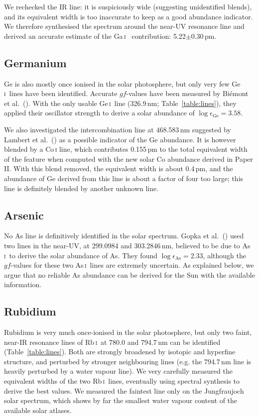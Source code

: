 \documentclass[traditabstract]{aa}
\newcommand{\altgai}{Ga\,\textsc{i}}
\newcommand{\altgei}{Ge\,\textsc{i}}
\newcommand{\altasi}{As\,\textsc{i}}
\newcommand{\altrbi}{Rb\,\textsc{i}}
\newcommand{\gai}{\altgai\ }
\newcommand{\gei}{\altgei\ }
\newcommand{\asi}{\altasi\ }
\newcommand{\rbi}{\altrbi\ }
\begin{document}
We rechecked the IR line: it is suspiciously wide (suggesting unidentified blends), and its equivalent width
is too inaccurate to keep as a good abundance indicator. We therefore synthesised the spectrum around
the near-UV resonance line and derived an accurate estimate of the \gai
contribution: 5.22$\pm$0.30\,pm.

\subsection{Germanium}
Ge is also mostly once ionised in the solar photosphere, but only very few \gei lines have been identified. Accurate $gf$-values have been measured by Bi\'emont et al.\ (\cite{biem2}).  With the only usable \gei line (326.9\,nm; Table~\ref{table:lines}), they applied their oscillator strength to derive a solar abundance of $\log\epsilon_{\mathrm{Ge}}=3.58$.

We also investigated the intercombination line at 468.583\,nm suggested by Lambert et al.\ (\cite{lamb}) as a possible indicator of the Ge abundance. It is however blended by a Co\,\textsc{i} line, which contributes 0.155\,pm to the total equivalent width of the feature when computed with the new solar Co abundance derived in Paper II.  With this blend removed, the equivalent width is about 0.4\,pm, and the abundance of Ge derived from this line is about a factor of four too large; this line is definitely blended by another unknown line.

\subsection{Arsenic}
No As line is definitively identified in the solar spectrum. Gopka et al.\ (\cite{gopka}) used two lines in the near-UV, at 299.0984 and 303.2846\,nm, believed to be due to \asi to derive the solar abundance of As.  They found $\log \epsilon_{\mathrm{As}}=2.33$, although the $gf$-values for these two \asi lines are extremely uncertain. As explained below, we argue that no reliable As abundance can be derived for the Sun with the available information. 

\subsection{Rubidium}
Rubidium is very much once-ionised in the solar photosphere, but only two faint, near-IR resonance lines  of \rbi at 780.0 and 794.7\,nm can be identified (Table~\ref{table:lines}).  Both are strongly broadened by isotopic and hyperfine structure, and perturbed by stronger neighbouring lines (e.g. the 794.7\,nm line is heavily
perturbed by a water vapour line).  We very carefully measured the equivalent widths of the two \rbi lines, eventually using spectral synthesis to derive the best values. We measured the faintest line only on the Jungfraujoch solar spectrum, which shows by far the smallest water vapour content of the available solar atlases.
\end{document}
